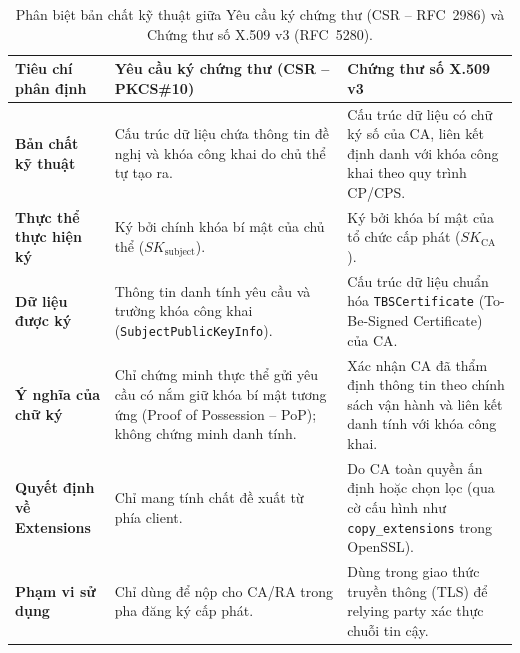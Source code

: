 \begin{table}[!htbp]
\centering
\small
\renewcommand{\arraystretch}{1.25}
\begin{tabularx}{\textwidth}{>{\raggedright\arraybackslash}p{3.2cm}>{\raggedright\arraybackslash}X>{\raggedright\arraybackslash}X}
\toprule
\textbf{Tiêu chí phân định} & \textbf{Yêu cầu ký chứng thư (CSR -- PKCS\#10)} & \textbf{Chứng thư số X.509 v3} \\
\midrule
\textbf{Bản chất kỹ thuật} & Cấu trúc dữ liệu chứa thông tin đề nghị và khóa công khai do chủ thể tự tạo ra. & Cấu trúc dữ liệu có chữ ký số của CA, liên kết định danh với khóa công khai theo quy trình CP/CPS. \\
\midrule
\textbf{Thực thể thực hiện ký} & Ký bởi chính khóa bí mật của chủ thể ($SK_{\text{subject}}$). & Ký bởi khóa bí mật của tổ chức cấp phát ($SK_{\text{CA}}$). \\
\midrule
\textbf{Dữ liệu được ký} & Thông tin danh tính yêu cầu và trường khóa công khai (\texttt{SubjectPublicKeyInfo}). & Cấu trúc dữ liệu chuẩn hóa \texttt{TBSCertificate} (To-Be-Signed Certificate) của CA. \\
\midrule
\textbf{Ý nghĩa của chữ ký} & Chỉ chứng minh thực thể gửi yêu cầu có nắm giữ khóa bí mật tương ứng (Proof of Possession -- PoP); không chứng minh danh tính. & Xác nhận CA đã thẩm định thông tin theo chính sách vận hành và liên kết danh tính với khóa công khai. \\
\midrule
\textbf{Quyết định về Extensions} & Chỉ mang tính chất đề xuất từ phía client. & Do CA toàn quyền ấn định hoặc chọn lọc (qua cờ cấu hình như \texttt{copy\_extensions} trong OpenSSL). \\
\midrule
\textbf{Phạm vi sử dụng} & Chỉ dùng để nộp cho CA/RA trong pha đăng ký cấp phát. & Dùng trong giao thức truyền thông (TLS) để relying party xác thực chuỗi tin cậy. \\
\bottomrule
\end{tabularx}
\caption[Phân biệt bản chất kỹ thuật giữa CSR và chứng thư số X.509]{Phân biệt bản chất kỹ thuật giữa Yêu cầu ký chứng thư (CSR -- RFC~2986) và Chứng thư số X.509 v3 (RFC~5280).}
\label{tab:csr-vs-x509}
\end{table}
